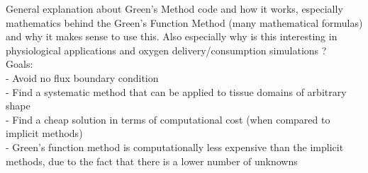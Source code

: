 General explanation about Green's Method code and how it works, especially mathematics behind the Green's Function Method (many mathematical formulas) and why it makes sense to use this. Also especially why is this interesting in physiological applications and oxygen delivery/consumption simulations ?
\\Goals:
\\- Avoid no flux boundary condition
\\- Find a systematic method that can be applied to tissue domains of arbitrary shape
\\- Find a cheap solution in terms of computational cost (when compared to implicit methods)
\\- Green's function method is computationally less expensive than the implicit methods, due to the fact that there is a lower number of unknowns


